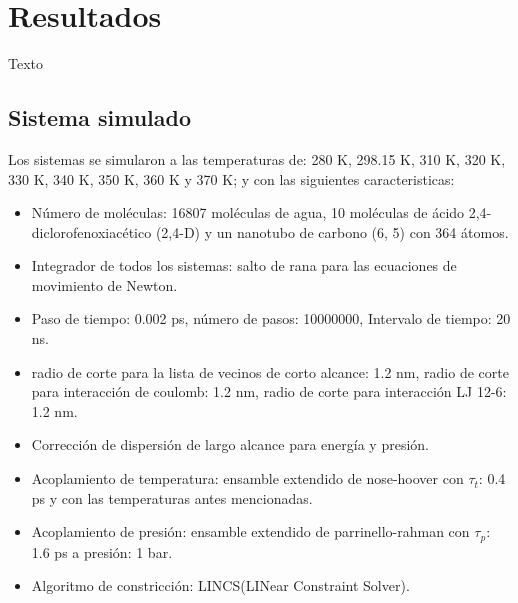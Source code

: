 \chapter{Resultados}
Texto

\section{Sistema simulado}

Los sistemas se simularon a las temperaturas de: 280 K, 298.15 K, 310 K, 320 K, 330 K, 340 K, 350 K, 360 K y 370 K; y con las siguientes caracteristicas:

\begin{itemize}
    \item Número de moléculas: 16807 moléculas de agua, 10 moléculas de ácido 2,4-diclorofenoxiacético (2,4-D) y un nanotubo de carbono (6, 5) con 364 átomos.
    \item Integrador de todos los sistemas: salto de rana para las ecuaciones de movimiento de Newton.
    \item Paso de tiempo: 0.002 ps, número de pasos: 10000000, Intervalo de tiempo: 20 ns.
    \item radio de corte para la lista de vecinos de corto alcance: 1.2 nm, radio de corte para interacción de coulomb: 1.2 nm, radio de corte para interacción LJ 12-6: 1.2 nm.
    \item Corrección de dispersión de largo alcance para energía y presión.
    \item Acoplamiento de temperatura: ensamble extendido de nose-hoover con $\tau_t$: 0.4 ps y con las temperaturas antes mencionadas.
    \item Acoplamiento de presión: ensamble extendido de parrinello-rahman con $\tau_p$: 1.6 ps a presión: 1 bar.
    \item Algoritmo de constricción: LINCS(LINear Constraint Solver).
\end{itemize}
